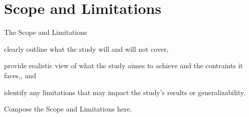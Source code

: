 \section{Scope and Limitations}

The Scope and Limitations
\begin{enumerate*}[(i)]
	\item clearly outline what the study will and will not cover,
	\item provide realistic view of what the study aimes to achieve and the contraints it faces,, and
	\item identify any limitations that may impact the study’s results or generalizability.
\end{enumerate*}
Compose the Scope and Limitations here.